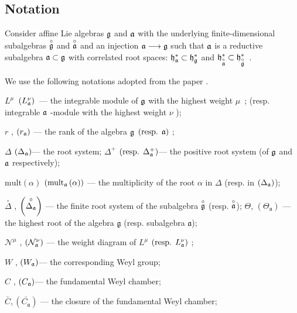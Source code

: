 \documentclass[a4paper,12pt]{article}
\theoremstyle{definition} \newtheorem{Def}{Definition}
\begin{document}
\subsection{Notation}
\label{sec:notation}

Consider affine Lie algebras $\frak{g}$ and $\frak{a}$ with the
underlying finite-dimensional subalgebras $\overset{\circ }{\frak{g}}$ and $%
\overset{\circ }{\frak{a}}$ and an injection $\frak{a}\longrightarrow \frak{g%
}$ such that $\frak{a}$ is a reductive subalgebra $\frak{a\subset g}$ with
correlated root spaces: $\frak{h}_{\frak{a}}^{\ast }\subset \frak{h}_{\frak{g%
}}^{\ast }$ and $\frak{h}_{\overset{\circ }{\frak{a}}}^{\ast }\subset \frak{h%
}_{\overset{\circ }{\frak{g}}}^{\ast }$\ .

We use the following notations adopted from the paper \cite{ilyin812pbc}.

$L^{\mu }$\ $\left( L_{\frak{a}}^{\nu }\right) $\ --- the integrable module
of $\frak{g}$ with the highest weight $\mu $\ ; (resp. integrable $\frak{a}$
-module with the highest weight $\nu $ );

$r$ , $\left( r_{\frak{a}}\right) $ --- the rank of the algebra $\frak{g}$ $%
\left( \text{resp. }\frak{a}\right) $ ;

$\Delta $ $\left( \Delta _{\frak{a}}\right) $--- the root system; $\Delta
^{+} $ $\left( \text{resp. }\Delta _{\frak{a}}^{+}\right) $--- the positive
root system (of $\frak{g}$ and $\frak{a}$ respectively);

$\mathrm{mult}\left( \alpha \right) $ $\left( \mathrm{mult}_{\frak{a}}\left(
\alpha \right) \right) $ --- the multiplicity of the root $\alpha$ in $\Delta
$ (resp. in $\left( \Delta _{\frak{a}}\right) $);

$\overset{\circ }{\Delta }$ , $\left( \overset{\circ }{\Delta _{\frak{a}}}%
\right) $ --- the finite root system of the subalgebra $\overset{\circ }{%
\frak{g}}$ (resp. $\overset{\circ }{\frak{a}}$);
$\Theta$, $(\Theta_{\mathfrak{a}})$ --- the highest root of the algebra $\mathfrak{g}$ (resp. subalgebra $\mathfrak{a}$);

$\mathcal{N}^{\mu }$ , $\left( \mathcal{N}_{\frak{a}}^{\nu }\right) $ --- the
weight diagram of $L^{\mu }$ $\left( \text{resp. }L_{\frak{a}}^{\nu }\right)
$ ;

$W$ , $\left( W_{\frak{a}}\right) $--- the corresponding Weyl group;

$C$ , $\left( C_{\frak{a}}\right) $--- the fundamental Weyl chamber;

$\bar{C}, \left(\bar{C_{\mathfrak{a}}}\right)$ --- the closure of the fundamental Weyl chamber;
\end{document}
